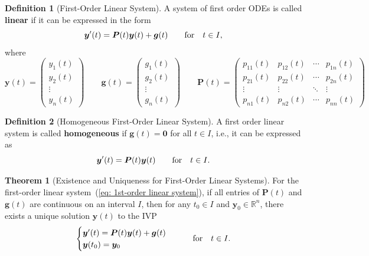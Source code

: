 \documentclass[10pt,UTF8]{article}
\renewcommand{\vec}[1]{\bm{#1}}
\newcommand{\mat}[1]{\bm{#1}}
\newenvironment{definitionBox}
{
  \begin{tcolorbox}[colback=blue!5!white,colframe=blue!75!black,parbox=false,before
  upper=\par,before lower=\par]}
  {
\end{tcolorbox}}
\newenvironment{theoremBox}
{
  \begin{tcolorbox}[colback=yellow!5!white,colframe=yellow!75!black,parbox=false,before
  upper=\par,before lower=\par]}
  {
\end{tcolorbox}}
\theoremstyle{definition}
\newtheorem{definition inner}{Definition}[section]
\newenvironment{definition}[1][]
{
  \begin{definitionBox}
  \begin{definition inner}[#1]\hfill\par}
    {
    \end{definition inner}
\end{definitionBox}}
\theoremstyle{definition}
\newtheorem{theorem inner}{Theorem}[section]
\newenvironment{theorem}[1][]
{
  \begin{theoremBox}
  \begin{theorem inner}[#1]\hfill\par}
    {
    \end{theorem inner}
\end{theoremBox}}
\theoremstyle{definition}
\newtheorem*{proof inner}{\textit{Proof}}
\theoremstyle{plain}
\newtheorem{tip inner}{Tip}[section]
\theoremstyle{remark}
\begin{document}
\begin{definition}[First-Order Linear System]
  {}\label{def: 1st-order linear system}
  A system of first order ODEs is called \textbf{linear} if it can be
  expressed in the form
  \begin{equation}
    \vec{y}'(t) = \mat{P}(t) \vec{y}(t) + \vec{g}(t) \quad \qfor t\in I,
    \label{eq: 1st-order linear system}
  \end{equation}
  where
  \begin{equation*}
    \vec{y}(t) =
    \begin{pmatrix}
      y_1(t) \\
      y_2(t) \\
      \vdots \\
      y_n(t)
    \end{pmatrix}
    \qquad
    \vec{g}(t) =
    \begin{pmatrix}
      g_1(t) \\
      g_2(t) \\
      \vdots \\
      g_n(t)
    \end{pmatrix}
    \qquad
    \mat{P}(t) =
    \begin{pmatrix}
      p_{11}(t) & p_{12}(t) & \cdots & p_{1n}(t) \\
      p_{21}(t) & p_{22}(t) & \cdots & p_{2n}(t) \\
      \vdots & \vdots & \ddots & \vdots \\
      p_{n1}(t) & p_{n2}(t) & \cdots & p_{nn}(t)
    \end{pmatrix}
  \end{equation*}
\end{definition}

\begin{definition}[Homogeneous First-Order Linear System]
  {}\label{def: Homogeneous 1st-order linear system}
  A first order linear system is called \textbf{homogeneous} if
  \(\vec{g}(t) = \vec{0}\) for all \(t\in I\), i.e., it can be expressed as
  \begin{equation*}
    \vec{y}'(t) = \mat{P}(t) \vec{y}(t) \quad \qfor t\in I.
  \end{equation*}
\end{definition}

\begin{theorem}[Existence and Uniqueness for First-Order Linear Systems]
  {}\label{thm: Existence and Uniqueness for 1st-order linear systems}
  For the first-order linear system~(\ref{eq: 1st-order linear system}),
  if all entries of \(\mat{P}(t)\) and \(\vec{g}(t)\) are continuous on
  an interval \(I\), then for any \(t_0 \in I\) and \(\vec{y}_0 \in
  \mathbb{R}^n\),
  there exists a unique solution \(\vec{y}(t)\) to the IVP
  \begin{equation*}
    \begin{cases}
      \vec{y}'(t) = \mat{P}(t) \vec{y}(t) + \vec{g}(t) \\
      \vec{y}(t_0) = \vec{y}_0
    \end{cases}
    \quad \qfor t\in I.
  \end{equation*}
\end{theorem}
\end{document}
